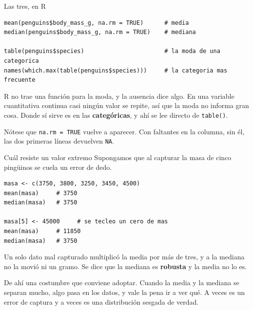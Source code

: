 \documentclass[aspectratio=169,10pt]{beamer}
\newcommand{\Rc}[1]{{\setlength{\fboxsep}{1.6pt}%
  \colorbox{codigoFondo}{\textcolor{codigoTexto}{\texttt{#1}}}}}
\newcommand{\destaca}[1]{%
  \par\vspace{3pt}\noindent
  \colorbox{azulClaro}{%
    \parbox{\dimexpr\linewidth-2\fboxsep\relax}{\vspace{3pt}#1\vspace{3pt}}}%
  \par\vspace{3pt}}
\begin{document}
\begin{frame}[fragile]{Las tres, en R}
\begin{lstlisting}
mean(penguins$body_mass_g, na.rm = TRUE)      # media
median(penguins$body_mass_g, na.rm = TRUE)    # mediana

table(penguins$species)                       # la moda de una categorica
names(which.max(table(penguins$species)))     # la categoria mas frecuente
\end{lstlisting}

  \vspace{0.25cm}
  \destaca{\small R no trae una función para la moda, y la ausencia dice algo. En una
  variable cuantitativa continua casi ningún valor se repite, así que la moda no informa
  gran cosa. Donde sí sirve es en las \textbf{categóricas}, y ahí se lee directo de
  \Rc{table()}.

  \vspace{0.15cm}
  Nótese que \Rc{na.rm = TRUE} vuelve a aparecer. Con faltantes en la columna, sin él,
  las dos primeras líneas devuelven \Rc{NA}.}
\end{frame}
\begin{frame}[fragile]{Cuál resiste un valor extremo}
  Supongamos que al capturar la masa de cinco pingüinos se cuela un error de dedo.

\begin{lstlisting}
masa <- c(3750, 3800, 3250, 3450, 4500)
mean(masa)     # 3750
median(masa)   # 3750

masa[5] <- 45000     # se tecleo un cero de mas
mean(masa)     # 11850
median(masa)   # 3750
\end{lstlisting}

  \vspace{0.25cm}
  \destaca{\small Un solo dato mal capturado multiplicó la media por más de tres, y a la
  mediana no la movió ni un gramo. Se dice que la mediana es \textbf{robusta} y la media
  no lo es.

  \vspace{0.15cm}
  De ahí una costumbre que conviene adoptar. Cuando la media y la mediana se separan
  mucho, algo pasa en los datos, y vale la pena ir a ver qué. A veces es un error de
  captura y a veces es una distribución sesgada de verdad.}
\end{frame}
\end{document}
